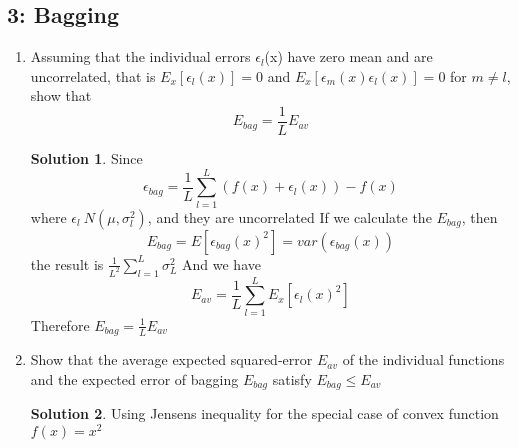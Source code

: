 \documentclass[]{book}
\theoremstyle{definition}
\newtheorem*{soln}{Solution}
\begin{document}
\subsection*{3: Bagging }
	\begin{enumerate}
		\item Assuming that the individual errors $\epsilon_l$(x) have zero mean and are uncorrelated, that is $E_x[\epsilon_l (x)] = 0$ and $E_x[\epsilon_m (x)\epsilon_l (x)] = 0$ for $m \neq l $, show that
		$$ E_{bag} = \frac{1}{L} E_{av}$$
		\begin{soln}
			Since 
			$$\epsilon_{bag} = \frac{1}{L}\sum_{l=1}^{L}(f(x)+\epsilon_l(x)) - f(x)$$
			where $\epsilon_l ~ N(\mu,\sigma_l ^2)$, and they are uncorrelated 
			If we calculate the $ E_{bag}$, then
			$$E_{bag} = E[\epsilon_{bag}(x)^2] = var(\epsilon_{bag}(x))$$
			the result is $\frac{1}{L^2}\sum_{l=1}^{L} \sigma_L ^2$
			And we have
			$$E_{av} = \frac{1}{L}\sum_{l=1}^{L}E_x[\epsilon_l(x)^2]$$
			Therefore $E_{bag} = \frac{1}{L}E_{av}$
		\end{soln}
	\item  Show that the average expected squared-error $E_{av}$ of the individual functions and the expected error of bagging $E_{bag}$ satisfy $E_{bag} \leq E_{av}$
	\begin{soln}
		Using Jensens inequality for the special case of convex function $f(x) = x^2$
	\end{soln}
	\end{enumerate}
\end{document}
